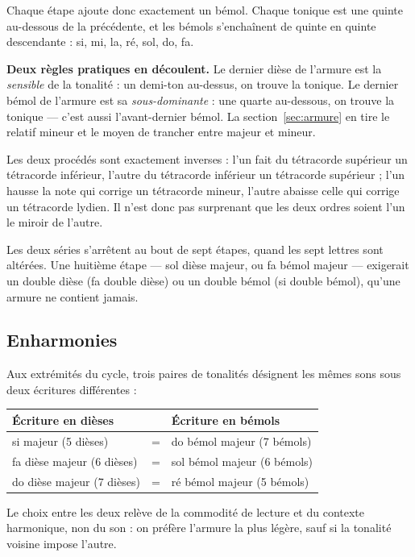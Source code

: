 \documentclass[a4paper,11pt]{article}
\begin{document}
Chaque étape ajoute donc exactement un bémol. Chaque tonique est une quinte
au-dessous de la précédente, et les bémols s'enchaînent de quinte en quinte
descendante : si, mi, la, ré, sol, do, fa.

\begin{remarque}
\textbf{Deux règles pratiques en découlent.} Le dernier dièse de l'armure
est la \emph{sensible} de la tonalité : un demi-ton au-dessus, on trouve la
tonique. Le dernier bémol de l'armure est sa \emph{sous-dominante} : une
quarte au-dessous, on trouve la tonique — c'est aussi l'avant-dernier bémol.
La section~\ref{sec:armure} en tire le relatif mineur et le moyen de trancher
entre majeur et mineur.
\end{remarque}

Les deux procédés sont exactement inverses : l'un fait du tétracorde
supérieur un tétracorde inférieur, l'autre du tétracorde inférieur un
tétracorde supérieur ; l'un hausse la note qui corrige un tétracorde mineur,
l'autre abaisse celle qui corrige un tétracorde lydien. Il n'est donc pas surprenant que les deux ordres soient l'un le
miroir de l'autre.

Les deux séries s'arrêtent au bout de sept étapes, quand les sept lettres
sont altérées. Une huitième étape — sol dièse majeur, ou fa bémol majeur —
exigerait un double dièse (fa double dièse) ou un double bémol (si double
bémol), qu'une armure ne contient jamais.

\subsection{Enharmonies}

Aux extrémités du cycle, trois paires de tonalités désignent les mêmes sons
sous deux écritures différentes :

\begin{center}
\begin{tabular}{@{}l c l@{}}
\toprule
\textbf{Écriture en dièses} & & \textbf{Écriture en bémols} \\
\midrule
si majeur (5 dièses) & = & do bémol majeur (7 bémols) \\
fa dièse majeur (6 dièses) & = & sol bémol majeur (6 bémols) \\
do dièse majeur (7 dièses) & = & ré bémol majeur (5 bémols) \\
\bottomrule
\end{tabular}
\end{center}

Le choix entre les deux relève de la commodité de lecture et du contexte
harmonique, non du son : on préfère l'armure la plus légère, sauf si la
tonalité voisine impose l'autre.
\end{document}
